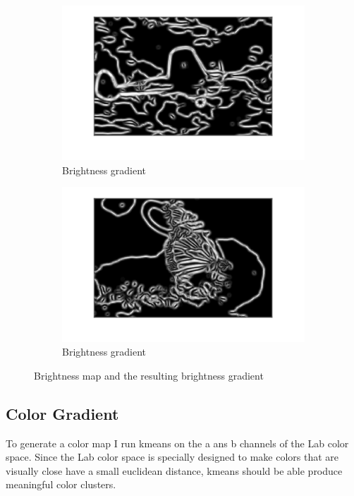 \documentclass[12pt]{article}
\begin{document}
\begin{figure}
    \begin{subfigure}[t]{.49\textwidth}
        \centering
        \includegraphics[width=\linewidth]{img/bg1}
        \caption{Brightness gradient}
    \end{subfigure}\hfill
    \begin{subfigure}[t]{.49\textwidth}
        \centering
        \includegraphics[width=\linewidth]{img/bg2}
        \caption{Brightness gradient}
    \end{subfigure}
    \caption{Brightness map and the resulting brightness gradient}
    \label{fig_bg}
\end{figure}


\subsection{Color Gradient}

To generate a color map I run kmeans on the a ans b channels of the Lab color space. Since the Lab color space is specially designed to make colors that are visually close have a small euclidean distance, kmeans should be able produce meaningful color clusters.
\end{document}
